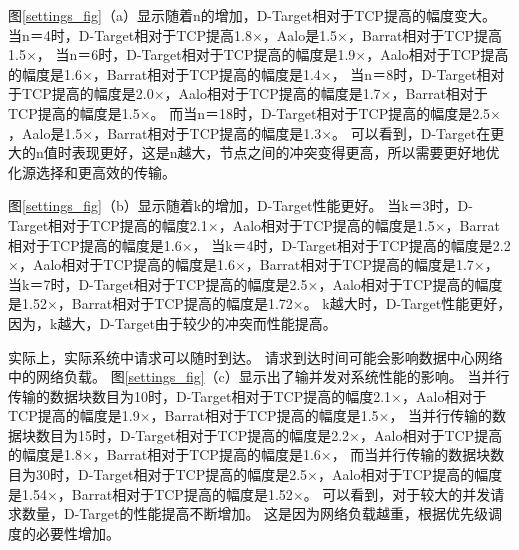 图\ref{settings_fig}（a）显示随着n的增加，D-Target相对于TCP提高的幅度变大。
当n＝4时，D-Target相对于TCP提高1.8$\times$，Aalo是1.5$\times$，Barrat相对于TCP提高1.5$\times$，
当n＝6时，D-Target相对于TCP提高的幅度是1.9$\times$，Aalo相对于TCP提高的幅度是1.6$\times$，Barrat相对于TCP提高的幅度是1.4$\times$，
当n＝8时，D-Target相对于TCP提高的幅度是2.0$\times$，Aalo相对于TCP提高的幅度是1.7$\times$，Barrat相对于TCP提高的幅度是1.5$\times$。
而当n＝18时，D-Target相对于TCP提高的幅度是2.5$\times$，Aalo是1.5$\times$，Barrat相对于TCP提高的幅度是1.3$\times$。
可以看到，D-Target在更大的n值时表现更好，这是n越大，节点之间的冲突变得更高，所以需要更好地优化源选择和更高效的传输。
 
图\ref{settings_fig}（b）显示随着k的增加，D-Target性能更好。
当k＝3时，D-Target相对于TCP提高的幅度2.1$\times$，Aalo相对于TCP提高的幅度是1.5$\times$，Barrat相对于TCP提高的幅度是1.6$\times$，
当k＝4时，D-Target相对于TCP提高的幅度是2.2$\times$，Aalo相对于TCP提高的幅度是1.6$\times$，Barrat相对于TCP提高的幅度是1.7$\times$，
当k＝7时，D-Target相对于TCP提高的幅度是2.5$\times$，Aalo相对于TCP提高的幅度是1.52$\times$，Barrat相对于TCP提高的幅度是1.72$\times$。
k越大时，D-Target性能更好，因为，k越大，D-Target由于较少的冲突而性能提高。

实际上，实际系统中请求可以随时到达。
请求到达时间可能会影响数据中心网络中的网络负载。
图\ref{settings_fig}（c）显示出了输并发对系统性能的影响。
当并行传输的数据块数目为10时，D-Target相对于TCP提高的幅度2.1$\times$，Aalo相对于TCP提高的幅度是1.9$\times$，Barrat相对于TCP提高的幅度是1.5$\times$，
当并行传输的数据块数目为15时，D-Target相对于TCP提高的幅度是2.2$\times$，Aalo相对于TCP提高的幅度是1.8$\times$，Barrat相对于TCP提高的幅度是1.6$\times$，
而当并行传输的数据块数目为30时，D-Target相对于TCP提高的幅度是2.5$\times$，Aalo相对于TCP提高的幅度是1.54$\times$，Barrat相对于TCP提高的幅度是1.52$\times$。
可以看到，对于较大的并发请求数量，D-Target的性能提高不断增加。
这是因为网络负载越重，根据优先级调度的必要性增加。

